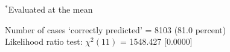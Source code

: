 \documentclass[11pt]{article}
\begin{document}
\begin{center}
\vspace{1ex}
\begin{center}
$^*$Evaluated at the mean
\end{center}
\vspace{1em}
\begin{raggedright}
Number of cases `correctly predicted' = 8103 (81.0 percent)\\
Likelihood ratio test: $\chi^2(11)$ = 1548.427 [0.0000]\\
\end{raggedright}

\end{center}
\end{document}
